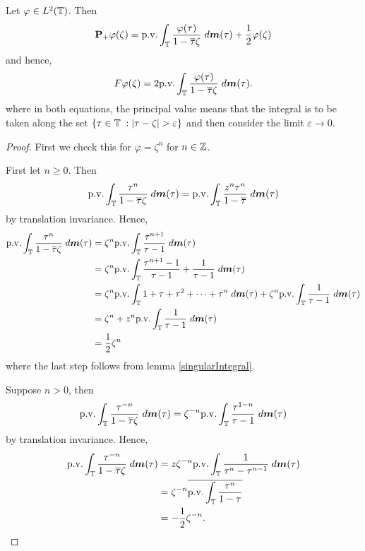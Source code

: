 \begin{theorem}
    Let $\varphi \in L^2(\mathbb{T})$. Then
    \begin{equation}
        \mathbf{P}_+\varphi(\zeta) = \mathrm{p.v.}\int_{\mathbb{T}} \frac{\varphi(\tau)}{1-\overline{\tau}\zeta}\;d\boldsymbol{m}(\tau)+\frac{1}{2}\varphi(\zeta)
    \end{equation}
    and hence,
    \begin{equation}
        F\varphi(\zeta) = 2\mathrm{p.v.}\int_{\mathbb{T}} \frac{\varphi(\tau)}{1-\overline{\tau}\zeta}\;d\boldsymbol{m}(\tau).
    \end{equation}
    where in both equations, the principal value means that the integral is to be taken along the set $\{ \tau\in \mathbb{T}\;:|\tau-\zeta| > \varepsilon\}$
    and then consider the limit $\varepsilon\rightarrow 0$.
\end{theorem}
\begin{proof}
    First we check this for $\varphi = \zeta^n$ for $n \in \mathbb{Z}$.
    
    First let $n \geq 0$. Then
    \begin{equation}
        \mathrm{p.v.}\int_{\mathbb{T}} \frac{\tau^n}{1-\overline{\tau}\zeta}\;d\boldsymbol{m}(\tau) = \mathrm{p.v.}\int_{\mathbb{T}} \frac{z^n\tau^n}{1-\overline{\tau}}\;d\boldsymbol{m}(\tau)
    \end{equation}
    by translation invariance.
    Hence,
    \begin{align*}
        \mathrm{p.v.}\int_{\mathbb{T}} \frac{\tau^n}{1-\overline{\tau}\zeta}\;d\boldsymbol{m}(\tau) &= \zeta^n\mathrm{p.v.}\int_{\mathbb{T}} \frac{\tau^{n+1}}{\tau-1}\;d\boldsymbol{m}(\tau) \\
        &= \zeta^n \mathrm{p.v.}\int_{\mathbb{T}} \frac{\tau^{n+1}-1}{\tau-1}+\frac{1}{\tau-1}\;d\boldsymbol{m}(\tau)\\
        &= \zeta^n \mathrm{p.v.}\int_{\mathbb{T}} 1+\tau+\tau^2+\cdots+\tau^{n}\;d\boldsymbol{m}(\tau)+\zeta^n\mathrm{p.v.}\int_{\mathbb{T}} \frac{1}{\tau-1}\;d\boldsymbol{m}(\tau)\\
        &= \zeta^n + z^n\mathrm{p.v.}\int_{\mathbb{T}} \frac{1}{\tau-1}\;d\boldsymbol{m}(\tau)\\
        &= \frac{1}{2}\zeta^n
    \end{align*}
    where the last step follows from lemma \ref{singularIntegral}.
    
    Suppose $n > 0$, then
    \begin{equation}
        \mathrm{p.v.}\int_{\mathbb{T}} \frac{\tau^{-n}}{1-\overline{\tau}\zeta}\;d\boldsymbol{m}(\tau) = \zeta^{-n} \mathrm{p.v.}\int_{\mathbb{T}} \frac{\tau^{1-n}}{\tau-1}\;d\boldsymbol{m}(\tau)
    \end{equation}
    by translation invariance. Hence,
    \begin{align*}
        \mathrm{p.v.}\int_{\mathbb{T}} \frac{\tau^{-n}}{1-\overline{\tau}\zeta}\;d\boldsymbol{m}(\tau) &=z \zeta^{-n} \mathrm{p.v.} \int_{\mathbb{T}} \frac{1}{\tau^n-\tau^{n-1}}\;d\boldsymbol{m}(\tau)\\
        &= \zeta^{-n}\overline{\mathrm{p.v.}\int_{\mathbb{T}} \frac{\tau^n}{1-\tau}}\\
        &= -\frac{1}{2}\zeta^{-n}.
    \end{align*}
    

\end{proof}

